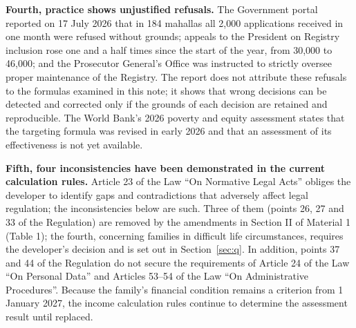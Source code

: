 \documentclass[14pt,a4paper]{extarticle}
\begin{document}
\textbf{Fourth, practice shows unjustified refusals.} The Government portal reported on 17 July 2026 that in 184 mahallas all 2,000 applications received in one month were refused without grounds; appeals to the President on Registry inclusion rose one and a half times since the start of the year, from 30,000 to 46,000; and the Prosecutor General’s Office was instructed to strictly oversee proper maintenance of the Registry\cite{govuz}. The report does not attribute these refusals to the formulas examined in this note; it shows that wrong decisions can be detected and corrected only if the grounds of each decision are retained and reproducible. The World Bank’s 2026 poverty and equity assessment states that the targeting formula was revised in early 2026 and that an assessment of its effectiveness is not yet available\cite{wb2026}.

\textbf{Fifth, four inconsistencies have been demonstrated in the current calculation rules.} Article 23 of the Law “On Normative Legal Acts” obliges the developer to identify gaps and contradictions that adversely affect legal regulation\cite{orq682}; the inconsistencies below are such. Three of them (points 26, 27 and 33 of the Regulation) are removed by the amendments in Section II of Material 1 (Table 1); the fourth, concerning families in difficult life circumstances, requires the developer’s decision and is set out in Section~\ref{sec:q}. In addition, points 37 and 44 of the Regulation do not secure the requirements of Article 24 of the Law “On Personal Data” and Articles 53–54 of the Law “On Administrative Procedures”. Because the family’s financial condition remains a criterion from 1 January 2027, the income calculation rules continue to determine the assessment result until replaced.
\end{document}
